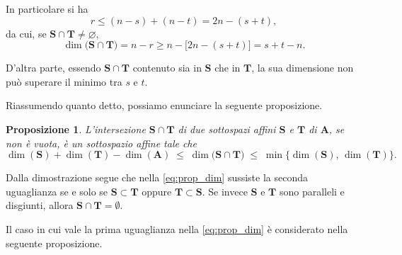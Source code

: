 \documentclass{article}
\theoremstyle{plain}
\newtheorem{prop}[thm]{Proposizione}
\theoremstyle{definition}
\theoremstyle{remark}
\begin{document}
In particolare si ha  
\begin{equation}\label{eq:stima_r}
  r \le (n - s) + (n - t) = 2n - (s + t),
\end{equation}
da cui, se $\mathbf{S} \cap \mathbf{T} \neq \varnothing$,  
\begin{equation}\label{eq:dim_ST}
  \dim\bigl(\mathbf{S} \cap \mathbf{T}\bigr) = n - r \ge n - \bigl[2n - (s+t)\bigr] = s + t - n.
\end{equation}

D'altra parte, essendo $\mathbf{S} \cap \mathbf{T}$ contenuto sia in $\mathbf{S}$ che in $\mathbf{T}$, la sua dimensione non può superare il minimo tra $s$ e $t$.

Riassumendo quanto detto, possiamo enunciare la seguente proposizione.

\vspace{10pt}

\begin{bxthm}
\begin{prop}\label{prima}
L'intersezione $\mathbf{S}\cap \mathbf{T}$ di due sottospazi affini $\mathbf{S}$ e $\mathbf{T}$ di $\mathbf{A}$, se non è vuota, è un sottospazio affine tale che    
\begin{equation}\label{eq:prop_dim}
  \dim(\mathbf{S}) + \dim(\mathbf{T}) - \dim(\mathbf{A}) \;\le\; \dim\bigl(\mathbf{S}\cap \mathbf{T}\bigr) 
  \;\le\; \min\bigl\{\dim(\mathbf{S}),\,\dim(\mathbf{T})\bigr\}.
\end{equation}
\end{prop}
\end{bxthm}

Dalla dimostrazione segue che nella \eqref{eq:prop_dim} sussiste la seconda uguaglianza se e solo se $\mathbf{S}\subset \mathbf{T}$ oppure $\mathbf{T}\subset \mathbf{S}$. 
Se invece $\mathbf{S}$ e $\mathbf{T}$ sono paralleli e disgiunti, allora $\mathbf{S}\cap \mathbf{T}=\emptyset$.

Il caso in cui vale la prima uguaglianza nella \eqref{eq:prop_dim} è considerato nella seguente proposizione.

\vspace{10pt}
\end{document}
